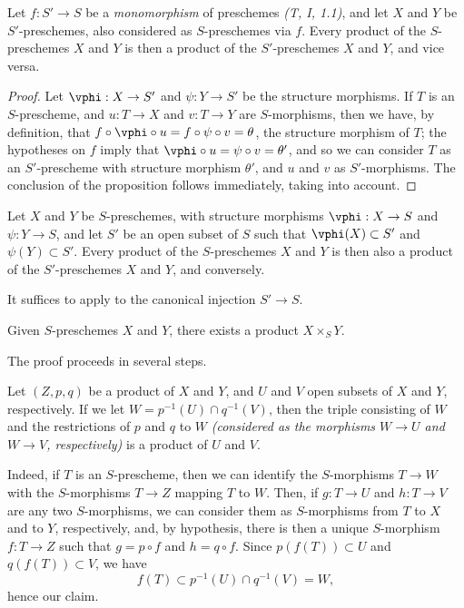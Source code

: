 \begin{proposition}[3.2.4]
\label{I.3.2.4}
Let $f:S'\to S$ be a \emph{monomorphism} of preschemes \emph{(T, I, 1.1)}, and let $X$ and $Y$ be
$S'$-preschemes, also considered as $S$-preschemes via $f$. Every product of
the $S$-preschemes $X$ and $Y$ is then a product of the $S'$-preschemes $X$ and $Y$, and vice versa.
\end{proposition}

\begin{proof}
Let $\vphi:X\to S'$ and $\psi:Y\to S'$ be the structure morphisms. If $T$ is an $S$-prescheme, and
$u:T\to X$ and $v:T\to Y$ are $S$-morphisms, then we have, by definition, that
$f\circ\vphi\circ u=f\circ\psi\circ v=\theta$, the structure morphism of $T$; the hypotheses
on $f$ imply that $\vphi\circ u=\psi\circ v=\theta'$, and so we can consider $T$ as an
$S'$-prescheme with structure morphism $\theta'$, and $u$ and $v$ as $S'$-morphisms. The
conclusion of the proposition follows immediately, taking  into account.
\end{proof}

\begin{corollary}[3.2.5]
\label{I.3.2.5}
Let $X$ and $Y$ be $S$-preschemes, with structure morphisms $\vphi:X\to S$ and $\psi:Y\to S$, and let
$S'$ be an open subset of $S$ such that $\vphi(X)\subset S'$ and $\psi(Y)\subset S'$. Every product
of the $S$-preschemes $X$ and $Y$ is then also a product of the $S'$-preschemes $X$ and $Y$, and
conversely.
\end{corollary}

It suffices to apply  to the canonical injection $S'\to S$.

\begin{theorem}[3.2.6]
\label{I.3.2.6}
Given $S$-preschemes $X$ and $Y$, there exists a product $X\times_S Y$.
\end{theorem}

The proof proceeds in several steps.
\begin{lemma}[3.2.6.1]
\label{I.3.2.6.1}
Let $(Z,p,q)$ be a product of $X$ and $Y$, and $U$ and $V$ open subsets of $X$ and $Y$,
respectively. If we let $W=p^{-1}(U)\cap q^{-1}(V)$, then the triple consisting of $W$ and
the restrictions of $p$ and $q$ to $W$ \emph{(considered as the morphisms $W\to U$ and $W\to V$,
respectively)} is a product of $U$ and $V$.
\end{lemma}

Indeed, if $T$ is an $S$-prescheme, then we can identify the $S$-morphisms $T\to W$ with the
$S$-morphisms $T\to Z$ mapping $T$ to $W$. Then, if $g:T\to U$ and $h:T\to V$ are any two
$S$-morphisms, we can consider them as $S$-morphisms from $T$ to $X$ and to $Y$, respectively,
and, by hypothesis, there is then a unique $S$-morphism $f:T\to Z$ such that $g=p\circ f$ and
$h=q\circ f$. Since $p(f(T))\subset U$ and $q(f(T))\subset V$, we have
\[
  f(T)\subset p^{-1}(U)\cap q^{-1}(V)=W,
\]
hence our claim.

